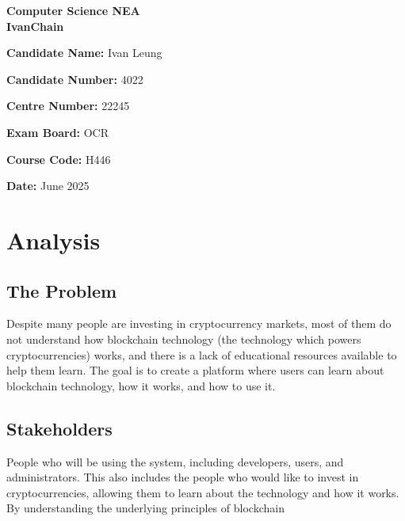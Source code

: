 \documentclass[12pt, a4paper]{scrartcl}
\begin{document}
\pagestyle{fancy}

\begin{titlepage}
    \centering
    \vspace*{2cm}
    {\Huge\bfseries Computer Science NEA\\[0.5em] IvanChain \par}
    \vspace{2cm}
    {\Large\textbf{Candidate Name:} Ivan Leung \par}
    \vspace{0.5cm}
    {\Large\textbf{Candidate Number:} 4022 \par}
    \vspace{0.5cm}
    {\Large\textbf{Centre Number:} 22245 \par}
    \vspace{0.5cm}
    {\Large\textbf{Exam Board:} OCR \par}
    \vspace{0.5cm}
    {\Large\textbf{Course Code:} H446 \par}
    \vspace{2cm}
    {\Large\textbf{Date:} June 2025 \par}
    \vfill
\end{titlepage}

\newpage
\tableofcontents
\newpage


\section{Analysis}
\label{sec:introduction}

\subsection{The Problem}
Despite many people are investing in cryptocurrency markets, most of them do not understand how blockchain technology (the technology which powers cryptocurrencies) works, 
and there is a lack of educational resources available to help them learn.
The goal is to create a platform where users can learn about blockchain technology, how it works, and how to use it.
\newpage
\subsection{Stakeholders}
People who will be using the system, including developers, users, and administrators.
This also includes the people who would like to invest in cryptocurrencies, allowing them to learn about the technology and how it works.
By understanding the underlying principles of blockchain
\newpage
\end{document}
